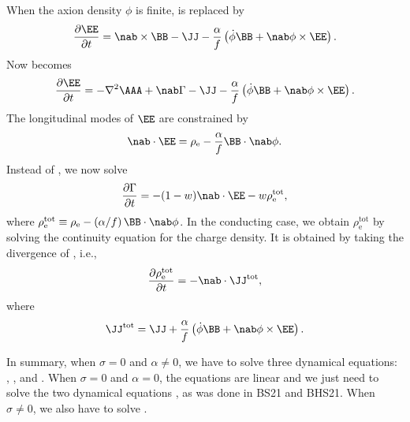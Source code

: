 \documentclass{article}
\begin{document}
When the axion density $\phi$ is finite,  is replaced by
\begin{equation}
\frac{\partial\EE}{\partial t}=\nab\times\BB-\JJ
-\frac{\alpha}{f}\left(\dot{\phi}\BB+\nab\phi\times\EE\right).
\label{dEdt2}
\end{equation}
Now  becomes
\begin{equation}
\frac{\partial\EE}{\partial t}=-\nabla^2\AAA+\nab \Gamma-\JJ
-\frac{\alpha}{f}\left(\dot{\phi}\BB+\nab\phi\times\EE\right).
\label{dE2dt2}
\end{equation}
The longitudinal modes of $\EE$ are constrained by
\begin{equation}
\nab\cdot\EE=\rho_\mathrm{e}-\frac{\alpha}{f}\BB\cdot\nab\phi.
\end{equation}
Instead of , we now solve
\begin{equation}
\frac{\partial\Gamma}{\partial t}=-(1-w)\nab\cdot\EE
-w\rho_\mathrm{e}^\mathrm{tot},
\label{dG2dt2}
\end{equation}
where $\rho_\mathrm{e}^\mathrm{tot}\equiv\rho_\mathrm{e}-(\alpha/f)\,\BB\cdot\nab\phi$.
In the conducting case, we obtain $\rho_\mathrm{e}^\mathrm{tot}$ by solving the continuity
equation for the charge density.
It is obtained by taking the divergence of , i.e.,
\begin{equation}
\frac{\partial\rho_\mathrm{e}^\mathrm{tot}}{\partial t}=-\nab\cdot\JJ^\mathrm{tot},
\label{drhoedt}
\end{equation}
where
\begin{equation}
\JJ^\mathrm{tot}=\JJ+\frac{\alpha}{f}\left(\dot{\phi}\BB+\nab\phi\times\EE\right).
\label{Jtot}
\end{equation}

In summary, when $\sigma=0$ and $\alpha\neq0$, we have to solve three dynamical equations:
, , and .
When $\sigma=0$ and $\alpha=0$, the equations are linear and we just need
to solve the two dynamical equations , as was done in
BS21 and BHS21.
When $\sigma\neq0$, we also have to solve .
\end{document}
